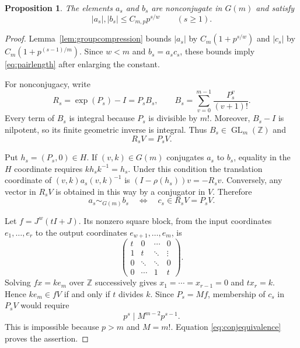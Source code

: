 \documentclass[11pt]{article}
\numberwithin{equation}{section}
\newtheorem{proposition}[theorem]{Proposition}
\theoremstyle{remark}
\newcommand{\Z}{\mathbb Z}
\newcommand{\GL}{\operatorname{GL}}
\begin{document}
\begin{proposition}\label{prop:pairs}
The elements $a_s$ and $b_s$ are nonconjugate in $G(m)$ and satisfy
\begin{equation}\label{eq:pairlength}
 |a_s|,|b_s|\le C_{m,p}p^{s/w}\qquad(s\ge1).
\end{equation}
\end{proposition}

\begin{proof}
Lemma~\ref{lem:groupcompression} bounds $|a_s|$ by
$C_m(1+p^{s/w})$ and $|c_s|$ by $C_m(1+p^{(s-1)/m})$.
Since $w<m$ and $b_s=a_sc_s$, these bounds imply
\eqref{eq:pairlength} after enlarging the constant.

For nonconjugacy, write
\begin{equation}\label{eq:R}
 R_s=\exp(P_s)-I=P_sB_s,\qquad
 B_s=\sum_{v=0}^{m-1}\frac{P_s^v}{(v+1)!}.
\end{equation}
Every term of $B_s$ is integral because $P_s$ is divisible by $m!$.
Moreover, $B_s-I$ is nilpotent, so its finite geometric inverse is
integral. Thus $B_s\in\GL_m(\Z)$ and
\begin{equation}\label{eq:integralimage}
 R_sV=P_sV.
\end{equation}

Put $h_s=(P_s,0)\in H$. If $(v,k)\in G(m)$ conjugates $a_s$ to
$b_s$, equality in the $H$ coordinate requires
$kh_sk^{-1}=h_s$. Under this condition the translation coordinate of
$(v,k)a_s(v,k)^{-1}$ is $(I-\rho(h_s))v=-R_sv$. Conversely, any
vector in $R_sV$ is obtained in this way by a conjugator in $V$.
Therefore
\begin{equation}\label{eq:conjequivalence}
 a_s\sim_{G(m)}b_s\quad\Longleftrightarrow\quad
 c_s\in R_sV=P_sV.
\end{equation}

Let $f=J^w(tI+J)$. Its nonzero square block, from the input
coordinates $e_1,\ldots,e_r$ to the output coordinates
$e_{w+1},\ldots,e_m$, is
\[
 \begin{pmatrix}
 t&0&\cdots&0\\
 1&t&\ddots&\vdots\\
 0&\ddots&\ddots&0\\
 0&\cdots&1&t
 \end{pmatrix}.
\]
Solving $fx=k e_m$ over $\Z$ successively gives
$x_1=\cdots=x_{r-1}=0$ and $t x_r=k$. Hence $k e_m\in fV$ if
and only if $t$ divides $k$. Since $P_s=Mf$, membership of $c_s$ in
$P_sV$ would require
\[
 p^s\mid M^{m-2}p^{s-1}.
\]
This is impossible because $p>m$ and $M=m!$. Equation
\eqref{eq:conjequivalence} proves the assertion.
\end{proof}
\end{document}
